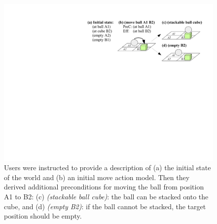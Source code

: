 \begin{figure}[h]
	\centering
	\includegraphics[width=0.75\linewidth]{figures/scenarios-exp1}
	\caption{Users were instructed to provide a description of (a) the initial state of the world and (b) an initial move action model.
		Then they derived additional preconditions for moving the ball from position A1 to B2: (c) \textit{(stackable ball cube)}: the ball can be stacked onto the cube, and (d) \textit{(empty B2)}: if the ball cannot be stacked, the target position should be empty.}
	\label{fig:scenarios-exp1}
\end{figure}

